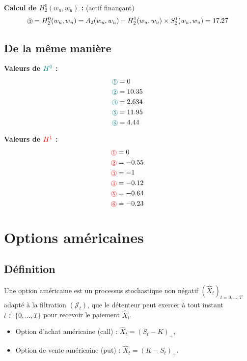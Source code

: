 \textbf{Calcul de $H_2^0(w_u, w_u)$ :} (actif finançant)
\[
\circled{3} = H_2^0(w_u, w_u) = A_2(w_u, w_u) - H_2^1(w_u, w_u) \times S_2^1(w_u, w_u) = 17.27
\]

\subsection*{De la même manière}

\begin{minipage}{0.45\textwidth}
\textbf{Valeurs de $\textcolor{teal}{H^0}$ :}
\begin{align*}
\textcolor{teal}{\circled{1}} &= 0 \\
\textcolor{teal}{\circled{2}} &= 10.35 \\
\textcolor{teal}{\circled{4}} &= 2.634 \\
\textcolor{teal}{\circled{5}} &= 11.95 \\
\textcolor{teal}{\circled{6}} &= 4.44
\end{align*}
\end{minipage}
\hfill
\begin{minipage}{0.45\textwidth}
\textbf{Valeurs de $\textcolor{red}{H^1}$ :}
\begin{align*}
\textcolor{red}{\circled{1}} &= 0 \\
\textcolor{red}{\circled{2}} &= -0.55 \\
\textcolor{red}{\circled{3}} &= -1 \\
\textcolor{red}{\circled{4}} &= -0.12 \\
\textcolor{red}{\circled{5}} &= -0.64 \\
\textcolor{red}{\circled{6}} &= -0.23
\end{align*}
\end{minipage}

\section{Options américaines}

\subsection{Définition}

Une option américaine est un processus stochastique non négatif $(\hat{X}_t)_{t=0,\dots,T}$ adapté à la filtration $(\mathcal{J}_t)$, que le détenteur peut exercer à tout instant $t\in\{0,\dots,T\}$ pour recevoir le paiement $\hat{X}_t$.

\begin{itemize}
    \item Option d'achat américaine (call) : $\hat{X}_t = (S_t - K)_+$,
    \item Option de vente américaine (put) : $\hat{X}_t = (K - S_t)_+$.
\end{itemize}

